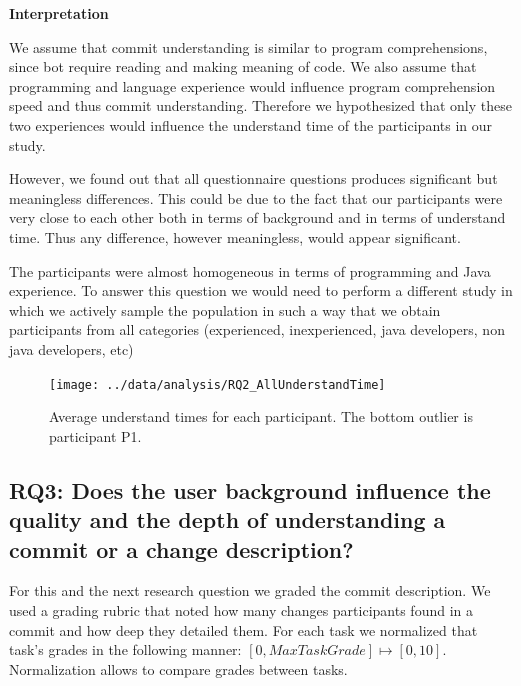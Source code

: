 \documentclass[letterpaper]{article}
\begin{document}
\textbf{Interpretation}

We assume that commit understanding is similar to program comprehensions, since bot require reading and making meaning of code.
We also assume that programming and language experience would influence program comprehension speed and thus commit understanding.
Therefore we hypothesized that only these two experiences would influence the understand time of the participants in our study.

However, we found out that all questionnaire questions produces significant but meaningless differences.
This could be due to the fact that our participants were very close to each  other both in terms of background and in terms of understand time.
Thus any difference, however meaningless, would appear significant.

The participants were almost homogeneous in terms of programming and Java experience.
To answer this question we would need to perform a different study in which we actively sample the population in such a way that we obtain participants from all categories (experienced, inexperienced, java developers, non java developers, etc)

\begin{figure}[H]
    \centering
    \texttt{[image: ../data/analysis/RQ2\_AllUnderstandTime]}
    \caption{Average understand times for each participant. The bottom outlier is participant P1.}
    \label{fig:rq2-understandTimes}
\end{figure}


\subsection{RQ3: Does the user background influence the quality and the depth of understanding a commit or a change description?}
\label{sec:RQ3}

For this and the next research question we graded the commit description.
We used a grading rubric that noted how many changes participants found in a commit and how deep they detailed them.
For each task we normalized that task's grades in the following manner: $ [0, MaxTaskGrade] \mapsto [0, 10]  $.
Normalization allows to compare grades between tasks.
\end{document}
